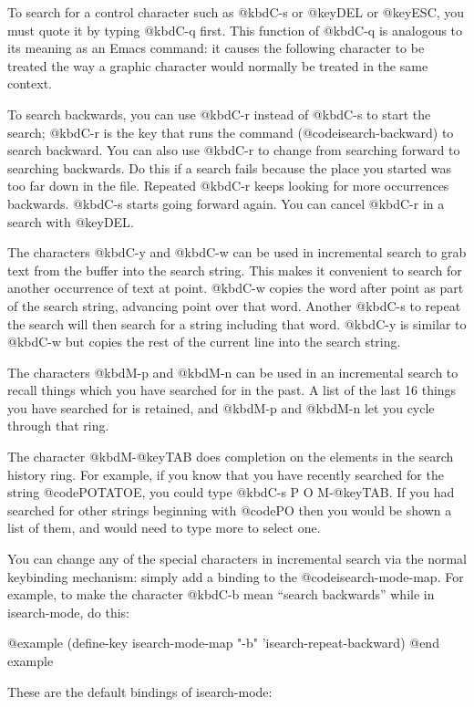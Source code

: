 {{{{  To search for a control character such as @kbd{C-s} or @key{DEL} or
@key{ESC}, you must quote it by typing @kbd{C-q} first.  This function
of @kbd{C-q} is analogous to its meaning as an Emacs command: it causes
the following character to be treated the way a graphic character would
normally be treated in the same context.

 To search backwards, you can use @kbd{C-r} instead of @kbd{C-s} to
start the search; @kbd{C-r} is the key that runs the command
(@code{isearch-backward}) to search backward.  You can also use
@kbd{C-r} to change from searching forward to searching backwards.  Do
this if a search fails because the place you started was too far down in the
file.  Repeated @kbd{C-r} keeps looking for more occurrences backwards.
@kbd{C-s} starts going forward again.  You can cancel @kbd{C-r} in a
search with @key{DEL}.

  The characters @kbd{C-y} and @kbd{C-w} can be used in incremental search
to grab text from the buffer into the search string.  This makes it
convenient to search for another occurrence of text at point.  @kbd{C-w}
copies the word after point as part of the search string, advancing
point over that word.  Another @kbd{C-s} to repeat the search will then
search for a string including that word.  @kbd{C-y} is similar to @kbd{C-w}
but copies the rest of the current line into the search string.

  The characters @kbd{M-p} and @kbd{M-n} can be used in an incremental
search to recall things which you have searched for in the past.  A
list of the last 16 things you have searched for is retained, and 
@kbd{M-p} and @kbd{M-n} let you cycle through that ring.

The character @kbd{M-@key{TAB}} does completion on the elements in 
the search history ring.  For example, if you know that you have
recently searched for the string @code{POTATOE}, you could type
@kbd{C-s P O M-@key{TAB}}.  If you had searched for other strings
beginning with @code{PO} then you would be shown a list of them, and
would need to type more to select one. 

  You can change any of the special characters in incremental search via
the normal keybinding mechanism: simply add a binding to the 
@code{isearch-mode-map}.  For example, to make the character
@kbd{C-b} mean ``search backwards'' while in isearch-mode, do this:

@example
(define-key isearch-mode-map "\C-b" 'isearch-repeat-backward)
@end example

These are the default bindings of isearch-mode:

}}}}
